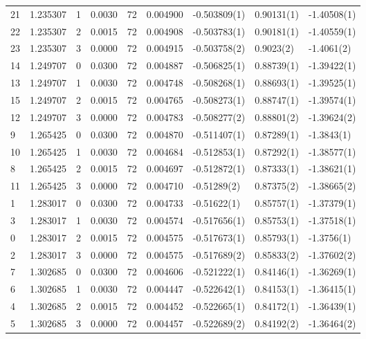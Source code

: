 \begin{tabular}{lrrrrrlll}
21 &  1.235307 &       1 &    0.0030 &     72 &  0.004900 &   -0.503809(1) &  0.90131(1) &  -1.40508(1) \\
22 &  1.235307 &       2 &    0.0015 &     72 &  0.004908 &   -0.503783(1) &  0.90181(1) &  -1.40559(1) \\
23 &  1.235307 &       3 &    0.0000 &     72 &  0.004915 &   -0.503758(2) &   0.9023(2) &   -1.4061(2) \\
14 &  1.249707 &       0 &    0.0300 &     72 &  0.004887 &   -0.506825(1) &  0.88739(1) &  -1.39422(1) \\
13 &  1.249707 &       1 &    0.0030 &     72 &  0.004748 &   -0.508268(1) &  0.88693(1) &  -1.39525(1) \\
15 &  1.249707 &       2 &    0.0015 &     72 &  0.004765 &   -0.508273(1) &  0.88747(1) &  -1.39574(1) \\
12 &  1.249707 &       3 &    0.0000 &     72 &  0.004783 &   -0.508277(2) &  0.88801(2) &  -1.39624(2) \\
9  &  1.265425 &       0 &    0.0300 &     72 &  0.004870 &   -0.511407(1) &  0.87289(1) &   -1.3843(1) \\
10 &  1.265425 &       1 &    0.0030 &     72 &  0.004684 &   -0.512853(1) &  0.87292(1) &  -1.38577(1) \\
8  &  1.265425 &       2 &    0.0015 &     72 &  0.004697 &   -0.512872(1) &  0.87333(1) &  -1.38621(1) \\
11 &  1.265425 &       3 &    0.0000 &     72 &  0.004710 &    -0.51289(2) &  0.87375(2) &  -1.38665(2) \\
1  &  1.283017 &       0 &    0.0300 &     72 &  0.004733 &    -0.51622(1) &  0.85757(1) &  -1.37379(1) \\
3  &  1.283017 &       1 &    0.0030 &     72 &  0.004574 &   -0.517656(1) &  0.85753(1) &  -1.37518(1) \\
0  &  1.283017 &       2 &    0.0015 &     72 &  0.004575 &   -0.517673(1) &  0.85793(1) &   -1.3756(1) \\
2  &  1.283017 &       3 &    0.0000 &     72 &  0.004575 &   -0.517689(2) &  0.85833(2) &  -1.37602(2) \\
7  &  1.302685 &       0 &    0.0300 &     72 &  0.004606 &   -0.521222(1) &  0.84146(1) &  -1.36269(1) \\
6  &  1.302685 &       1 &    0.0030 &     72 &  0.004447 &   -0.522642(1) &  0.84153(1) &  -1.36415(1) \\
4  &  1.302685 &       2 &    0.0015 &     72 &  0.004452 &   -0.522665(1) &  0.84172(1) &  -1.36439(1) \\
5  &  1.302685 &       3 &    0.0000 &     72 &  0.004457 &   -0.522689(2) &  0.84192(2) &  -1.36464(2) \\
\bottomrule
\end{tabular}
